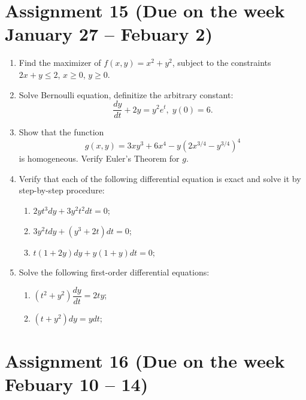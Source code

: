 \documentclass[12pt]{article} %
\theoremstyle{definition} %
\begin{document}
\section{Assignment 15 (Due on the week January 27 – Febuary 2)}

\begin{enumerate}
\item Find the maximizer of $f(x,y)=x^2+y^2$, subject to the constraints $2x+y\leqslant 2$, $x\geqslant0$, $y\geqslant 0$.

\item Solve Bernoulli equation, definitize the arbitrary constant:
\[
	\frac{dy}{dt}+2y=y^2e^t, \; y(0)=6.
\]

\item Show that the function
\[
	g(x,y)=3xy^3+6x^4-y(2x^{3/4}-y^{3/4})^4
\]
is homogeneous. Verify Euler's Theorem for $g$.

\item Verify that each of the following differential equation is exact and solve it by step-by-step procedure:
\begin{enumerate}
\item $2yt^3dy+3y^2t^2dt=0$;
\item $3y^2tdy+(y^3+2t)dt=0$;
\item $t(1+2y)dy+y(1+y)dt=0$;
\end{enumerate}
\item Solve the following first-order differential equations:
\begin{enumerate}
\item $(t^2+y^2)\dfrac{dy}{dt}=2ty$;
\item $(t+y^2)dy=ydt$;
\end{enumerate}
\end{enumerate}



\section{Assignment 16 (Due on the week Febuary 10 – 14)}
\end{document}
